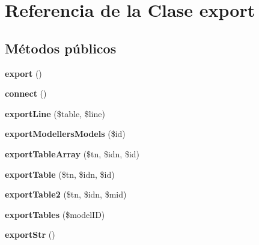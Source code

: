 \hypertarget{classexport}{\section{\-Referencia de la \-Clase export}
\label{classexport}
}
\subsection*{\-Métodos públicos}
\begin{DoxyCompactItemize}
\item 
\hypertarget{classexport_a6bb9adef631ba2c4e6c145c9e8f65d0e}{{\bfseries export} ()}\label{classexport_a6bb9adef631ba2c4e6c145c9e8f65d0e}

\item 
\hypertarget{classexport_a7491b9998567bd762e24f5c9be0e9a38}{{\bfseries connect} ()}\label{classexport_a7491b9998567bd762e24f5c9be0e9a38}

\item 
\hypertarget{classexport_a21bab30d532758a7a55156a4f06cb266}{{\bfseries export\-Line} (\$table, \$line)}\label{classexport_a21bab30d532758a7a55156a4f06cb266}

\item 
\hypertarget{classexport_abbd1e1328e3da9f01b20e506935722d6}{{\bfseries export\-Modellers\-Models} (\$id)}\label{classexport_abbd1e1328e3da9f01b20e506935722d6}

\item 
\hypertarget{classexport_a582ace8f99822af23299fcd2209295c9}{{\bfseries export\-Table\-Array} (\$tn, \$idn, \$id)}\label{classexport_a582ace8f99822af23299fcd2209295c9}

\item 
\hypertarget{classexport_a90fe702f9b0a74dc81c9d0986c2b23fc}{{\bfseries export\-Table} (\$tn, \$idn, \$id)}\label{classexport_a90fe702f9b0a74dc81c9d0986c2b23fc}

\item 
\hypertarget{classexport_a50fa4458dbe94ed2c6ea9e4a616728cd}{{\bfseries export\-Table2} (\$tn, \$idn, \$mid)}\label{classexport_a50fa4458dbe94ed2c6ea9e4a616728cd}

\item 
\hypertarget{classexport_a6f0205af2076d84df46cc761ec1c068b}{{\bfseries export\-Tables} (\$model\-I\-D)}\label{classexport_a6f0205af2076d84df46cc761ec1c068b}

\item 
\hypertarget{classexport_abdd608d3ef87829b0e3750fad13b10f2}{{\bfseries export\-Str} ()}\label{classexport_abdd608d3ef87829b0e3750fad13b10f2}

\end{DoxyCompactItemize}
